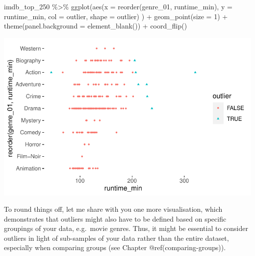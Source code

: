 \documentclass[
  letterpaper,
]{krantz}
\makeatletter
\newenvironment{Shaded}{\begin{snugshade}}{\end{snugshade}}
\newcommand{\AttributeTok}[1]{\textcolor[rgb]{0.40,0.45,0.13}{#1}}
\newcommand{\DecValTok}[1]{\textcolor[rgb]{0.68,0.00,0.00}{#1}}
\newcommand{\FunctionTok}[1]{\textcolor[rgb]{0.28,0.35,0.67}{#1}}
\newcommand{\NormalTok}[1]{\textcolor[rgb]{0.00,0.23,0.31}{#1}}
\newcommand{\SpecialCharTok}[1]{\textcolor[rgb]{0.37,0.37,0.37}{#1}}
\newenvironment{kframe}{%
\medskip{}
\setlength{\fboxsep}{.8em}
 \def\at@end@of@kframe{}%
 \ifinner\ifhmode%
  \def\at@end@of@kframe{\end{minipage}}%
  \begin{minipage}{\columnwidth}%
 \fi\fi%
 \def\FrameCommand##1{\hskip\@totalleftmargin \hskip-\fboxsep
 \colorbox{shadecolor}{##1}\hskip-\fboxsep
     \hskip-\linewidth \hskip-\@totalleftmargin \hskip\columnwidth}%
 \MakeFramed {\advance\hsize-\width
   \@totalleftmargin\z@ \linewidth\hsize
   \@setminipage}}%
 {\par\unskip\endMakeFramed%
 \at@end@of@kframe}
\renewenvironment{Shaded}{\begin{kframe}}{\end{kframe}}
\makeatother
\begin{document}
\begin{Shaded}
\begin{Highlighting}[]
\NormalTok{imdb\_top\_250 }\SpecialCharTok{\%\textgreater{}\%}
  \FunctionTok{ggplot}\NormalTok{(}\FunctionTok{aes}\NormalTok{(}\AttributeTok{x =} \FunctionTok{reorder}\NormalTok{(genre\_01, runtime\_min),}
             \AttributeTok{y =}\NormalTok{ runtime\_min,}
             \AttributeTok{col =}\NormalTok{ outlier,}
             \AttributeTok{shape =}\NormalTok{ outlier)}
\NormalTok{         ) }\SpecialCharTok{+}
  \FunctionTok{geom\_point}\NormalTok{(}\AttributeTok{size =} \DecValTok{1}\NormalTok{) }\SpecialCharTok{+}
  \FunctionTok{theme}\NormalTok{(}\AttributeTok{panel.background =} \FunctionTok{element\_blank}\NormalTok{()) }\SpecialCharTok{+}
  \FunctionTok{coord\_flip}\NormalTok{()}
\end{Highlighting}
\end{Shaded}

\includegraphics{09_sources_of_bias_files/figure-pdf/plot-outliers-different-format-1.pdf}

To round things off, let me share with you one more visualisation, which
demonstrates that outliers might also have to be defined based on
specific groupings of your data, e.g.~movie genres. Thus, it might be
essential to consider outliers in light of sub-samples of your data
rather than the entire dataset, especially when comparing groups (see
Chapter @ref(comparing-groups)).
\end{document}
